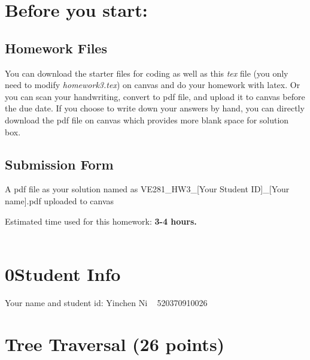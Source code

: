 \documentclass[11pt]{exam}
\begin{document}
\setlength{\parindent}{0pt}
\section*{Before you start:}

\subsection*{Homework Files}
You can download the starter files for coding as well as this \textit{tex} file (you only need to modify \textit{homework3.tex}) on canvas and do your homework with latex. Or you can scan your handwriting, convert to pdf file, and upload it to canvas before the due date. If you choose to write down your answers by hand, you can directly download the pdf file on canvas which provides more blank space for solution box.\\

\subsection*{Submission Form}
A pdf file as your solution named as VE281\_HW3\_[Your Student ID]\_[Your name].pdf uploaded to canvas


Estimated time used for this homework: \textbf{3-4 hours.}
\\\\


\newpage
\section*{0\quad Student Info}
Your name and student id: Yinchen Ni ~ 520370910026
\begin{solution}
\end{solution}

\section{Tree Traversal (26 points)}
\end{document}
